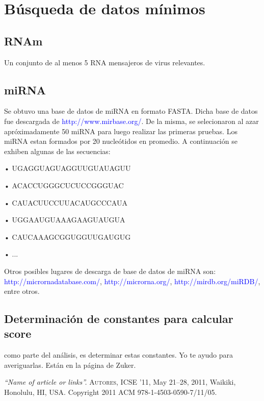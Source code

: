 \documentclass[12pt,a4paper,spanish]{article}
\begin{document}
\section{Búsqueda de datos mínimos}
	\subsection{RNAm}
		\par Un conjunto de al menos 5 RNA mensajeros de virus relevantes.

	\subsection{miRNA}
		\par Se obtuvo una base de datos de miRNA en formato FASTA. Dicha base de datos fue descargada de \textcolor{blue}{http://www.mirbase.org/}. De 		la misma, se selecionaron al azar apróximadamente 50 miRNA para luego realizar las primeras pruebas. Los miRNA estan formados por 20 nucleótidos 			en promedio. A continuación se exhiben algunas de las secuencias: 
			\par \hspace*{0.75cm} • \textsc{UGAGGUAGUAGGUUGUAUAGUU}
			\par \hspace*{0.75cm} • \textsc{ACACCUGGGCUCUCCGGGUAC}
			\par \hspace*{0.75cm} • \textsc{CAUACUUCCUUACAUGCCCAUA}
			\par \hspace*{0.75cm} • \textsc{UGGAAUGUAAAGAAGUAUGUA}
			\par \hspace*{0.75cm} • \textsc{CAUCAAAGCGGUGGUUGAUGUG}
			\par \hspace*{0.75cm} • \textsc{...}
		\par Otros posibles lugares de descarga de base de datos de miRNA son: \textcolor{blue}{http://micrornadatabase.com/},
		\textcolor{blue}{http://microrna.org/}, \textcolor{blue}{http://mirdb.org/miRDB/}, entre otros.

	\subsection{Determinación de constantes para calcular score}
		como parte del análisis, es determinar estas constantes. Yo te ayudo para averiguarlas. Están en la página de Zuker.
		

\begin{thebibliography}{99}
\small	{} {\em{“Name of article or links”}.}
			\textsc{Autores}, ICSE ’11, May 21–28, 2011, Waikiki, Honolulu, HI, USA. Copyright 2011 ACM 978-1-4503-0590-7/11/05.
\end{thebibliography}
\end{document}
